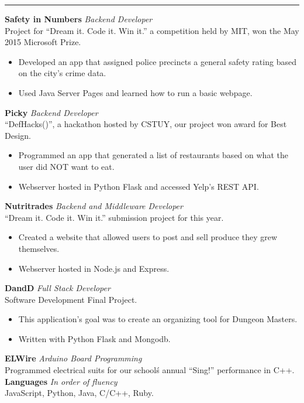 \documentclass[14, .75in]{article}
\begin{document}
  \vspace{0.1cm} \hrule \vspace{0.3cm}
  \noindent\textbf{Safety in Numbers}\textit{ Backend Developer}\\
  Project for ``Dream it. Code it. Win it.'' a competition held by MIT, won the May 2015 Microsoft Prize.
  \begin{itemize}[label={--},noitemsep, topsep=0pt]
    \item Developed an app that assigned police precincts a general safety rating based on the city's crime data.
    \item Used Java Server Pages and learned how to run a basic webpage.
  \end{itemize}
  \textbf{Picky}\textit{ Backend Developer}\\ ``DefHacks()'', a hackathon hosted by CSTUY, our project won award for Best Design.
  \begin{itemize}[label={--},noitemsep, topsep=0pt]
    \item Programmed an app that generated a list of restaurants based on what the user did NOT want to eat.
    \item Webserver hosted in Python Flask and accessed Yelp's REST API.
  \end{itemize}
  \textbf{Nutritrades}\textit{ Backend and Middleware Developer}\\
  ``Dream it. Code it. Win it.'' submission project for this year.
  \begin{itemize}[label={--},noitemsep, topsep=0pt]
    \item Created a website that allowed users to post and sell produce they grew themselves.
    \item Webserver hosted in Node.js and Express.
  \end{itemize}
  \textbf{DandD}\textit{ Full Stack Developer}\\
  Software Development Final Project.
  \begin{itemize}[label={--},noitemsep, topsep=0pt]
    \item This application's goal was to create an organizing tool for Dungeon Masters.
    \item Written with Python Flask and Mongodb.
  \end{itemize}
  \textbf{ELWire}\textit{ Arduino Board Programming}\\
  Programmed electrical suits for our school\'s annual ``Sing!'' performance in C++.\\
  \textbf{Languages}\textit{ In order of fluency}\\
  JavaScript, Python, Java, C/C++, Ruby.\\
\end{document}
